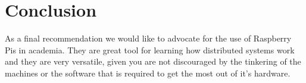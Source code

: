 \documentclass[10pt,a4wide]{article}
\begin{document}
\begin{figure}[!htb]
\centering
\hfill
{}
\hfill
\centering
{}
\hfill
\end{figure}

\newpage
\section{Conclusion}


As a final recommendation we would like to advocate for the use of Raspberry Pis in academia. They are great tool for learning how distributed systems work and they are very versatile, given you are not discouraged by the tinkering of the machines or the software that is required to get the most out of it's hardware.


\newpage
{}


\nocite{*}
\end{document}
